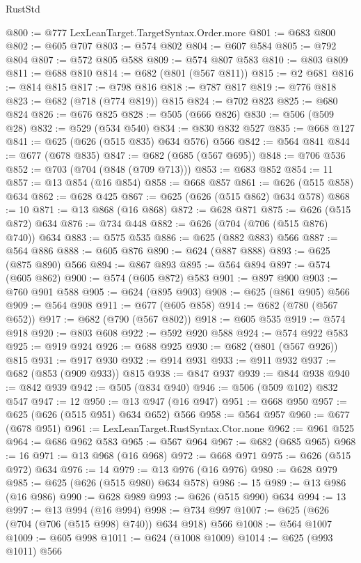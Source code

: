 \begin{lexlean}{RustStd}
\begin{coremodule}
@800 := @777 LexLeanTarget.TargetSyntax.Order.more
@801 := @683 @800
@802 := @605 @707
@803 := @574 @802
@804 := @607 @584
@805 := @792 @804
@807 := @572 @805 @588
@809 := @574 @807 @583
@810 := @803 @809
@811 := @688 @810
@814 := @682 (@801 (@567 @811))
@815 := @2 @681
@816 := @814 @815
@817 := @798 @816
@818 := @787 @817
@819 := @776 @818
@823 := @682 (@718 (@774 @819)) @815
@824 := @702 @823
@825 := @680 @824
@826 := @676 @825
@828 := @505 (@666 @826)
@830 := @506 (@509 @28)
@832 := @529 (@534 @540)
@834 := @830 @832 @527
@835 := @668 @127
@841 := @625 (@626 (@515 @835) @634 @576) @566
@842 := @564 @841
@844 := @677 (@678 @835)
@847 := @682 (@685 (@567 @695))
@848 := @706 @536
@852 := @703 (@704 (@848 (@709 @713)))
@853 := @683 @852
@854 := 11
@857 := @13 @854 (@16 @854)
@858 := @668 @857
@861 := @626 (@515 @858) @634
@862 := @628 @425
@867 := @625 (@626 (@515 @862) @634 @578)
@868 := 10
@871 := @13 @868 (@16 @868)
@872 := @628 @871
@875 := @626 (@515 @872) @634
@876 := @734 @448
@882 := @626 (@704 (@706 (@515 @876) @740)) @634
@883 := @575 @535
@886 := @625 (@882 @883) @566
@887 := @564 @886
@888 := @605 @876
@890 := @624 (@887 @888)
@893 := @625 (@875 @890) @566
@894 := @867 @893
@895 := @564 @894
@897 := @574 (@605 @862)
@900 := @574 (@605 @872) @583
@901 := @897 @900
@903 := @760 @901 @588
@905 := @624 (@895 @903)
@908 := @625 (@861 @905) @566
@909 := @564 @908
@911 := @677 (@605 @858)
@914 := @682 (@780 (@567 @652))
@917 := @682 (@790 (@567 @802))
@918 := @605 @535
@919 := @574 @918
@920 := @803 @608
@922 := @592 @920 @588
@924 := @574 @922 @583
@925 := @919 @924
@926 := @688 @925
@930 := @682 (@801 (@567 @926)) @815
@931 := @917 @930
@932 := @914 @931
@933 := @911 @932
@937 := @682 (@853 (@909 @933)) @815
@938 := @847 @937
@939 := @844 @938
@940 := @842 @939
@942 := @505 (@834 @940)
@946 := @506 (@509 @102) @832 @547
@947 := 12
@950 := @13 @947 (@16 @947)
@951 := @668 @950
@957 := @625 (@626 (@515 @951) @634 @652) @566
@958 := @564 @957
@960 := @677 (@678 @951)
@961 := LexLeanTarget.RustSyntax.Ctor.none
@962 := @961 @525
@964 := @686 @962 @583
@965 := @567 @964
@967 := @682 (@685 @965)
@968 := 16
@971 := @13 @968 (@16 @968)
@972 := @668 @971
@975 := @626 (@515 @972) @634
@976 := 14
@979 := @13 @976 (@16 @976)
@980 := @628 @979
@985 := @625 (@626 (@515 @980) @634 @578)
@986 := 15
@989 := @13 @986 (@16 @986)
@990 := @628 @989
@993 := @626 (@515 @990) @634
@994 := 13
@997 := @13 @994 (@16 @994)
@998 := @734 @997
@1007 := @625 (@626 (@704 (@706 (@515 @998) @740)) @634 @918) @566
@1008 := @564 @1007
@1009 := @605 @998
@1011 := @624 (@1008 @1009)
@1014 := @625 (@993 @1011) @566

\end{coremodule}
\end{lexlean}
